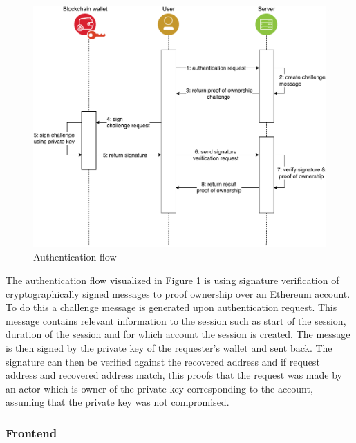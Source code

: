 \begin{figure}[ht]
    \centering
    \includegraphics[width=\textwidth, keepaspectratio]{diagrams/authentication_flow.drawio.pdf}
    \caption{Authentication flow}
    \label{fig:auth_flow}
\end{figure}

The authentication flow visualized in Figure \ref{fig:auth_flow} is using signature verification of cryptographically signed messages to proof ownership over an Ethereum account. To do this a challenge message is generated upon authentication request. This message contains relevant information to the session such as start of the session, duration of the session and for which account the session is created. The message is then signed by the private key of the requester's wallet and sent back. The signature can then be verified against the recovered address and if request address and recovered address match, this proofs that the request was made by an actor which is owner of the private key corresponding to the account, assuming that the private key was not compromised.

\subsubsection{Frontend}


